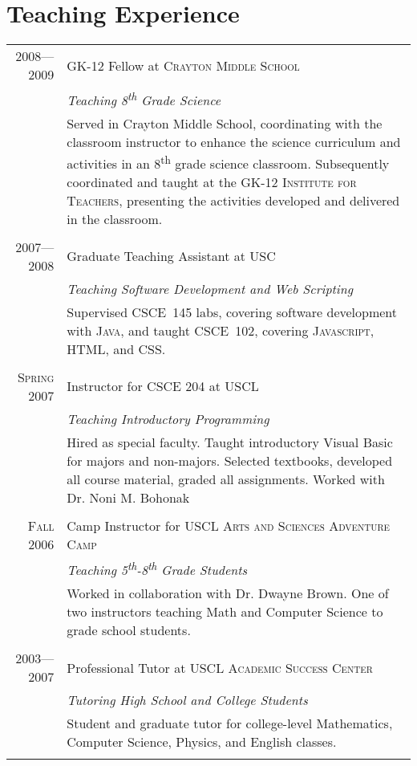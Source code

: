 \documentclass[a4paper,10pt]{article}
\begin{document}
\section{Teaching Experience}
\begin{longtable}{r|p{11cm}}
\textsc{2008---2009}
& GK-12 Fellow at \textsc{Crayton Middle School} \\
&\emph{Teaching 8\textsuperscript{th} Grade Science}\\
&\footnotesize{Served in Crayton Middle School, coordinating with the classroom instructor to enhance the science curriculum and activities in an 8\textsuperscript{th} grade science classroom. Subsequently coordinated and taught at the \textsc{GK-12 Institute for Teachers}, presenting the activities developed and delivered in the classroom.}
\\\multicolumn{2}{c}{} \\
\textsc{2007---2008} & Graduate Teaching Assistant at \textsc{USC} \\
&\emph{Teaching Software Development and Web Scripting}\\
&\footnotesize{Supervised CSCE~145 labs, covering software development with \textsc{Java}, and taught CSCE~102, covering \textsc{Javascript}, \textsc{HTML}, and \textsc{CSS}.}\\\multicolumn{2}{c}{} \\
\textsc{Spring 2007} &  Instructor for \textsc{CSCE 204} at \textsc{USCL} \\
&\emph{Teaching Introductory Programming}\\
&\footnotesize{Hired as special faculty. Taught introductory Visual Basic for majors and non-majors. Selected textbooks, developed all course material, graded all assignments. Worked with Dr. Noni M. Bohonak}\\\multicolumn{2}{c}{} \\
\textsc{Fall 2006} & Camp Instructor for \textsc{USCL Arts and Sciences Adventure Camp} \\
&\emph{Teaching 5\textsuperscript{th}-8\textsuperscript{th} Grade Students}\\
&\footnotesize{Worked in collaboration with Dr. Dwayne Brown. One of two instructors teaching Math and Computer Science to grade school students.}\\\multicolumn{2}{c}{} \\
\textsc{2003---2007} & Professional Tutor at \textsc{USCL Academic Success Center} \\
&\emph{Tutoring High School and College Students}\\
&\footnotesize{Student and graduate tutor for college-level Mathematics, Computer Science, Physics, and English classes.}\\\multicolumn{2}{c}{} \\
\end{longtable}
\end{document}
